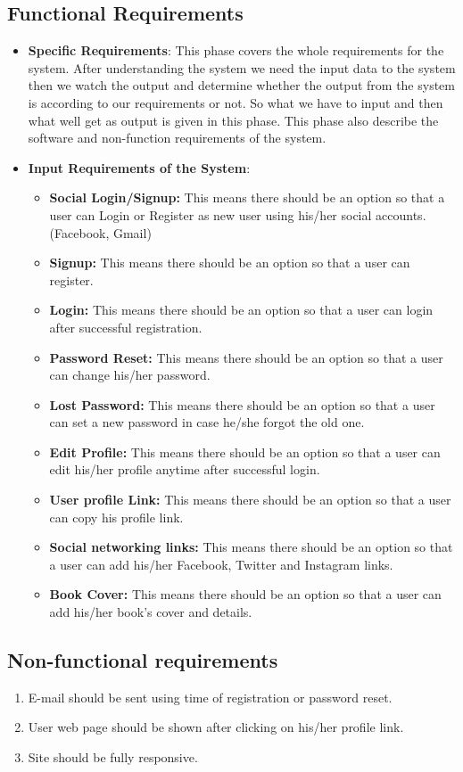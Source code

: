 \subsection{Functional Requirements}
\begin{itemize}
    \item  {\bf Specific Requirements}: This phase covers the whole requirements for the system. After
    understanding the system we need the input data to the system then we watch the output
    and determine whether the output from the system is according to our requirements or not.
    So what we have to input and then what well get as output is given in this phase. This phase
    also describe the software and non-function requirements of the system.

    \item {\bf Input Requirements of the System}:
    \begin{itemize}
     \item \textbf{Social Login/Signup:} This means there should be an option so that a user can Login or Register as new user using his/her social accounts. (Facebook, Gmail)
     \item \textbf{Signup:} This means there should be an option so that a user can register.
     \item \textbf{Login:} This means there should be an option so that a user can login after successful registration.
     \item \textbf{Password Reset:} This means there should be an option so that a user can change his/her password.
     \item \textbf{Lost Password:} This means there should be an option so that a user can set a new password in case he/she forgot the old one.
     \item \textbf{Edit Profile:} This means there should be an option so that a user can edit his/her profile anytime after successful login.
     \item \textbf{User profile Link:} This means there should be an option so that a user can copy his profile link.
     \item \textbf{Social networking links:} This means there should be an option so that a user can add his/her Facebook, Twitter and Instagram links. 
     \item \textbf{Book Cover:} This means there should be an option so that a user can add his/her book’s cover and details.

     \end{itemize}

\end{itemize}
\subsection{Non-functional requirements}
\begin{enumerate}
   \item E-mail should be sent using time of registration or password reset.
   \item User web page should be shown after clicking on his/her profile link.
   \item Site should be fully responsive.
\end{enumerate}

